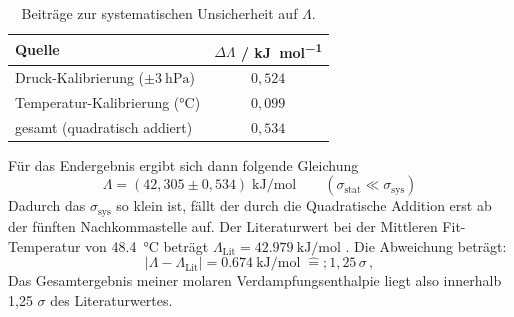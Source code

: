 \documentclass[twoside]{protokoll}
\begin{document}
\begin{table}[htb]
  \centering
  \caption{Beiträge zur systematischen Unsicherheit auf $\Lambda$.}
  \begin{tabular}{lc}
    \toprule
    Quelle & $\Delta\Lambda$ / \si{\kilo\joule\per\mole} \\
    \midrule
    Druck-Kalibrierung ($\pm\SI{3}{\hecto\pascal}$) & $0{,}524$ \\
    Temperatur-Kalibrierung ($\si{\celsius}$) & $0{,}099$ \\
    \midrule
    gesamt (quadratisch addiert) & $0{,}534$ \\
    \bottomrule
  \end{tabular}
\end{table}
Für das Endergebnis ergibt sich dann folgende Gleichung
\begin{equation}
    \Lambda = (42,305 \pm 0,534)\;\si{\kilo\joule\per\mole}
    \qquad (\sigma_{\text{stat}} \ll \sigma_{\text{sys}})
\end{equation}
Dadurch das $\sigma_{\text{sys}}$ so klein ist, fällt der durch die Quadratische Addition erst ab der fünften Nachkommastelle auf.
Der Literaturwert bei der Mittleren Fit-Temperatur von \SI{48.4}{\celsius} beträgt $\Lambda_{\text{Lit}} = \SI{42.979}{\kilo\joule\per\mole}$ . Die Abweichung beträgt:
\begin{equation}
    |\Lambda-\Lambda_{\text{Lit}}| = \SI{0.674}{\kilo\joule\per\mole}
    \;\widehat{=};1,25\,\sigma\, ,
\end{equation}
Das Gesamtergebnis meiner molaren Verdampfungsenthalpie liegt also innerhalb 1,25 $\sigma$ des Literaturwertes.
\end{document}

